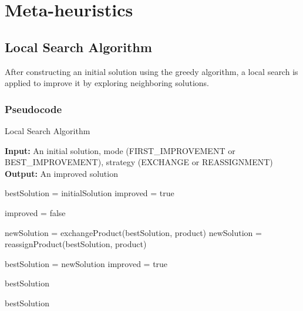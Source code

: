 \documentclass{article}
\begin{document}
\section{Meta-heuristics}

\subsection{Local Search Algorithm}
After constructing an initial solution using the greedy algorithm, a local search is applied to improve it by exploring neighboring solutions.

\subsubsection{Pseudocode}
\begin{algorithm}
\caption{Local Search Algorithm}
\begin{algorithmic}
    \State \textbf{Input:} An initial solution, mode (FIRST\_IMPROVEMENT or BEST\_IMPROVEMENT), strategy (EXCHANGE or REASSIGNMENT)
    \State \textbf{Output:} An improved solution

    \State bestSolution = initialSolution
    \State improved = true
        
        \State improved = false

                \State newSolution = exchangeProduct(bestSolution, product)
                \State newSolution = reassignProduct(bestSolution, product)
            \EndIf

                \State bestSolution = newSolution
                \State improved = true
                
                    \State \Return bestSolution
                \EndIf
            \EndIf
        \EndFor
    \EndWhile

    \State \Return bestSolution
\end{algorithmic}
\end{algorithm}
\end{document}
